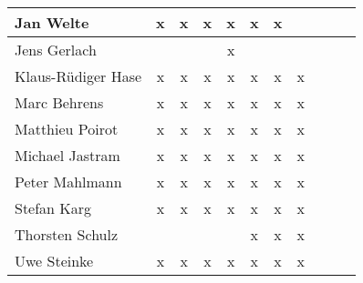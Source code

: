 \documentclass[a4paper, 11pt]{article}
\begin{document}
\begin{tabular}{|l|c|c|c|c||c|c|c||c|c|c|}
Jan Welte             & x & x & x & x & x & x &   \\\hline
Jens Gerlach          &   &   &   & x &  &  &   \\\hline
Klaus-R\"udiger Hase & x & x & x & x & x & x & x \\\hline
Marc Behrens         & x & x & x & x & x & x & x  \\\hline
Matthieu Poirot       & x & x & x & x & x & x & x  \\\hline
Michael Jastram       & x & x & x & x & x & x & x  \\\hline
Peter Mahlmann        & x & x & x & x & x & x & x \\\hline
Stefan Karg          & x  & x & x  & x & x & x & x \\\hline
Thorsten Schulz      &   &   &  &  & x & x & x \\\hline
Uwe Steinke          & x & x & x & x & x & x & x \\\hline
\end{tabular}
\end{document}

